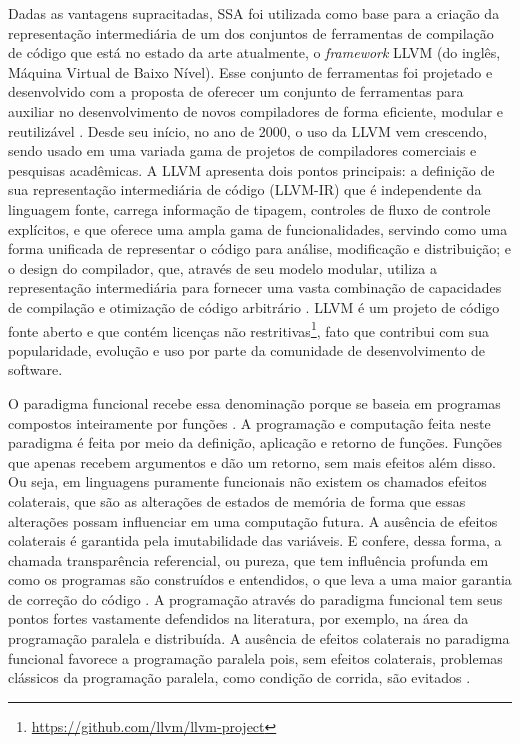 Dadas as vantagens supracitadas, SSA foi utilizada como base para a criação da representação intermediária de um dos conjuntos de ferramentas de compilação de código que está no estado da arte atualmente, o \emph{framework} LLVM (do inglês, Máquina Virtual de Baixo Nível). Esse conjunto de ferramentas foi projetado e desenvolvido com a proposta de oferecer um conjunto de ferramentas para auxiliar no desenvolvimento de novos compiladores de forma eficiente, modular e reutilizável \cite{lattner2004llvm}. Desde seu início, no ano de 2000, o uso da LLVM vem crescendo, sendo usado em uma variada gama de projetos de compiladores comerciais e pesquisas acadêmicas. A LLVM apresenta dois pontos principais: a definição de sua representação intermediária de código (LLVM-IR) que é independente da linguagem fonte, carrega informação de tipagem, controles de fluxo de controle explícitos, e que oferece uma ampla gama de funcionalidades, servindo como uma forma unificada de representar o código para análise, modificação e distribuição; e o design do compilador, que, através de seu modelo modular, utiliza a representação intermediária para fornecer uma vasta combinação de capacidades de compilação e otimização de código arbitrário \cite{lattner2004llvm}. LLVM é um projeto de código fonte aberto e que contém licenças não restritivas\footnote{\url{https://github.com/llvm/llvm-project}}, fato que contribui com sua popularidade, evolução e uso por parte da comunidade de desenvolvimento de software.

O paradigma funcional recebe essa denominação porque se baseia em programas compostos inteiramente por funções \cite{hughes1989functional}. A programação e computação feita neste paradigma é feita por meio da definição, aplicação e retorno de funções. Funções que apenas recebem argumentos e dão um retorno, sem mais efeitos além disso. Ou seja, em linguagens puramente funcionais não existem os chamados efeitos colaterais, que são as alterações de estados de memória de forma que essas alterações possam influenciar em uma computação futura. A ausência de efeitos colaterais é garantida pela imutabilidade das variáveis. E confere, dessa forma, a chamada transparência referencial, ou pureza, que tem influência profunda em como os programas são construídos e entendidos, o que leva a uma maior garantia de correção do código \cite{whymattered}. A programação através do paradigma funcional tem seus pontos fortes vastamente defendidos na literatura, por exemplo, na área da programação paralela e distribuída. A ausência de efeitos colaterais no paradigma funcional favorece a programação paralela pois, sem efeitos colaterais, problemas clássicos da programação paralela, como condição de corrida, são evitados \cite{hammond2011parallel} \cite{whymattered}.

